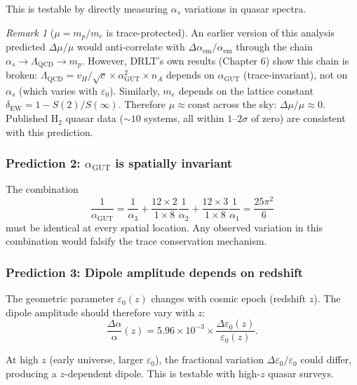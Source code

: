 \documentclass[12pt]{article}
\theoremstyle{remark}
\newtheorem{remark}[theorem]{Remark}
\theoremstyle{definition}
\newcommand{\agut}{\alpha_{\mathrm{GUT}}}
\begin{document}
This is testable by directly measuring $\alpha_s$ variations in quasar spectra.

\begin{remark}[$\mu = m_p/m_e$ is trace-protected]
An earlier version of this analysis predicted $\Delta\mu/\mu$ would anti-correlate with $\Delta\alpha_\text{em}/\alpha_\text{em}$ through the chain $\alpha_s \to \Lambda_\text{QCD} \to m_p$. However, DRLT's own results (Chapter 6) show this chain is broken: $\Lambda_\text{QCD} = v_H/\sqrt{c} \times \agut^2 \times n_A$ depends on $\agut$ (trace-invariant), not on $\alpha_s$ (which varies with $\varepsilon_0$). Similarly, $m_e$ depends on the lattice constant $\delta_\text{EW} = 1 - S(2)/S(\infty)$. Therefore $\mu \approx \text{const}$ across the sky: $\Delta\mu/\mu \approx 0$. Published H$_2$ quasar data ($\sim 10$ systems, all within $1$--$2\sigma$ of zero) are consistent with this prediction.
\end{remark}

\subsubsection{Prediction 2: $\agut$ is spatially invariant}

The combination
\begin{equation}
\frac{1}{\agut} = \frac{1}{\alpha_3} + \frac{12 \times 2}{1 \times 8}\frac{1}{\alpha_2} + \frac{12 \times 3}{1 \times 8}\frac{1}{\alpha_1} = \frac{25\pi^2}{6}
\end{equation}
must be identical at every spatial location. Any observed variation in this combination would falsify the trace conservation mechanism.

\subsubsection{Prediction 3: Dipole amplitude depends on redshift}

The geometric parameter $\varepsilon_0(z)$ changes with cosmic epoch (redshift $z$). The dipole amplitude should therefore vary with $z$:
\begin{equation}
\frac{\Delta\alpha}{\alpha}(z) = 5.96 \times 10^{-3} \times \frac{\Delta\varepsilon_0(z)}{\varepsilon_0(z)}.
\end{equation}

At high $z$ (early universe, larger $\varepsilon_0$), the fractional variation $\Delta\varepsilon_0/\varepsilon_0$ could differ, producing a $z$-dependent dipole. This is testable with high-$z$ quasar surveys.
\end{document}
